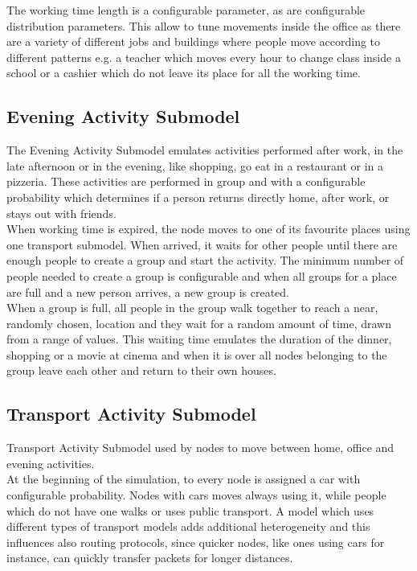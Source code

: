 The working time length is a configurable parameter, as are configurable distribution parameters. This allow to tune movements inside the office as there are a variety of different jobs and buildings where people move according to different patterns e.g. a teacher which moves every hour to change class inside a school or a cashier which do not leave its place for all the working time.


\subsection{Evening Activity Submodel}
The Evening Activity Submodel emulates activities performed after work, in the late afternoon or in the evening, like shopping, go eat in a restaurant or in a pizzeria. These activities are performed in group and with a configurable probability which determines if a person returns directly home, after work, or stays out with friends.
\\

When working time is expired, the node moves to one of its favourite places using one transport submodel. When arrived, it waits for other people until there are enough people to create a group and start the activity. The minimum number of people needed to create a group is configurable and when all groups for a place are full and a new person arrives, a new group is created.
\\

When a group is full, all people in the group walk together to reach a near, randomly chosen, location and they wait for a random amount of time, drawn from a range of values. This waiting time emulates the duration of the dinner, shopping or a movie at cinema and when it is over all nodes belonging to the group leave each other and return to their own houses.

\subsection{Transport Activity Submodel}
Transport Activity Submodel used by nodes to move between home, office and evening activities.
\\

At the beginning of the simulation, to every node is assigned a car with configurable probability. Nodes with cars moves always using it, while people which do not have one walks or uses public transport. A model which uses different types of transport models adds additional heterogeneity and this influences also routing protocols, since quicker nodes, like ones using cars for instance, can quickly transfer packets for longer distances.
\\


